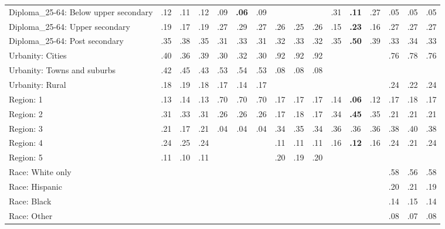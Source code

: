 \begin{tabular}[t]{lccccccccccccccc}
\addlinespace
Diploma\_25-64: Below upper secondary & .12 & .11 & .12 & .09 & \textbf{.06} & .09 &  &  &  & .31 & \textbf{.11} & .27 & .05 & .05 & .05\\
Diploma\_25-64: Upper secondary & .19 & .17 & .19 & .27 & .29 & .27 & .26 & .25 & .26 & .15 & \textbf{.23} & .16 & .27 & .27 & .27\\
Diploma\_25-64: Post secondary & .35 & .38 & .35 & .31 & .33 & .31 & .32 & .33 & .32 & .35 & \textbf{.50} & .39 & .33 & .34 & .33\\
\addlinespace
Urbanity: Cities & .40 & .36 & .39 & .30 & .32 & .30 & .92 & .92 & .92 &  &  &  & .76 & .78 & .76\\
Urbanity: Towns and suburbs & .42 & .45 & .43 & .53 & .54 & .53 & .08 & .08 & .08 &  &  &  &  &  & \\
Urbanity: Rural & .18 & .19 & .18 & .17 & .14 & .17 &  &  &  &  &  &  & .24 & .22 & .24\\
\addlinespace
Region: 1 & .13 & .14 & .13 & .70 & .70 & .70 & .17 & .17 & .17 & .14 & \textbf{.06} & .12 & .17 & .18 & .17\\
Region: 2 & .31 & .33 & .31 & .26 & .26 & .26 & .17 & .18 & .17 & .34 & \textbf{.45} & .35 & .21 & .21 & .21\\
Region: 3 & .21 & .17 & .21 & .04 & .04 & .04 & .34 & .35 & .34 & .36 & .36 & .36 & .38 & .40 & .38\\
Region: 4 & .24 & .25 & .24 &  &  &  & .11 & .11 & .11 & .16 & \textbf{.12} & .16 & .24 & .21 & .24\\
Region: 5 & .11 & .10 & .11 &  &  &  & .20 & .19 & .20 &  &  &  &  &  & \\
\addlinespace
Race: White only &  &  &  &  &  &  &  &  &  &  &  &  & .58 & .56 & .58\\
Race: Hispanic &  &  &  &  &  &  &  &  &  &  &  &  & .20 & .21 & .19\\
Race: Black &  &  &  &  &  &  &  &  &  &  &  &  & .14 & .15 & .14\\
Race: Other &  &  &  &  &  &  &  &  &  &  &  &  & .08 & .07 & .08\\
\bottomrule
\end{tabular}